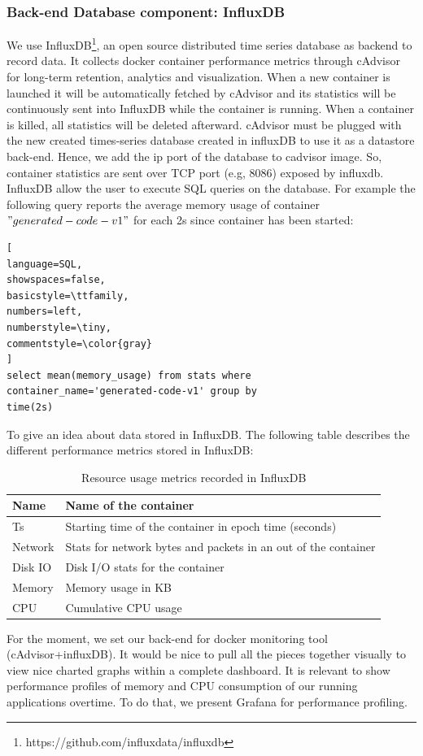 \subsubsection{Back-end Database component: InfluxDB}
We use InfluxDB\footnote{https://github.com/influxdata/influxdb}, an open source distributed time series database as backend to record data. It collects docker container performance metrics through cAdvisor for long-term retention, analytics and visualization. When a new container is launched it will be automatically fetched by cAdvisor and its statistics will be continuously sent into InfluxDB while the container is running. When a container is killed, all statistics will be deleted afterward. cAdvisor must be plugged with the new created
times-series database created in influxDB to use it as a datastore back-end. Hence, we add the ip port of the database to cadvisor image. So, container statistics are sent over TCP port (e.g, 8086) exposed by influxdb.
InfluxDB allow the user to execute SQL queries on the database. For example the following query reports the average memory usage of container $"generated-code-v1"$ for each 2s since container has been started:

\begin{lstlisting}[
language=SQL,
showspaces=false,
basicstyle=\ttfamily,
numbers=left,
numberstyle=\tiny,
commentstyle=\color{gray}
]
select mean(memory_usage) from stats where 
container_name='generated-code-v1' group by 
time(2s)
\end{lstlisting}
To give an idea about data stored in InfluxDB. The following table describes the different performance metrics stored in InfluxDB:
 \begin{table}[h]
 	\begin{center}
 		\begin{tabular}{|p{1cm}|p{6.9cm}|}
 			\hline
 			 Name & Name of the container \\
 			\hline
 			 Ts & Starting time of the container in epoch time (seconds) \\
 			\hline
 			 Network &  Stats for network bytes and packets in an out of the container \\
 			\hline
 			 Disk IO &  Disk I/O stats for the container \\
 			\hline
 			 Memory &  Memory usage in KB \\
 			
 			\hline
 		   	CPU &  Cumulative CPU usage \\
 			\hline
 			
 		\end{tabular}
 		
 	\end{center}
 	\caption {Resource usage metrics recorded in InfluxDB}
 \end{table}
For the moment, we set our back-end for docker monitoring tool (cAdvisor+influxDB). It would be nice to pull all the pieces together visually to view nice charted graphs within a complete dashboard. It is relevant to show performance profiles of memory and CPU consumption of our running applications overtime. To do that, we present Grafana for performance profiling. 

